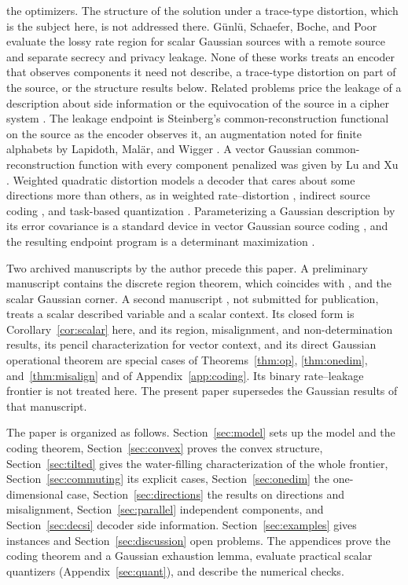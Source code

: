 \documentclass[11pt,onecolumn]{IEEEtran}
\begin{document}
the optimizers. The structure of the solution under a trace-type
distortion, which is the subject here, is not addressed there.
G\"unl\"u, Schaefer, Boche, and
Poor \cite{gunlu2022} evaluate the lossy rate region for scalar Gaussian
sources with a remote source and separate secrecy and privacy leakage.
None of these works treats an encoder that observes components it need
not describe, a trace-type distortion on part of the source, or the
structure results below. Related problems price the leakage of a
description about side information
\cite{yamamoto1983,tandon2013,makhdoumi2014} or the equivocation of the
source in a cipher system \cite{yamamoto1997,schieler2014}. The leakage
endpoint is Steinberg's common-reconstruction functional
\cite{steinberg2009} on the source as the encoder observes it, an
augmentation noted for finite alphabets by Lapidoth, Mal\"ar, and Wigger
\cite{lapidoth2014}. A vector Gaussian common-reconstruction function
with every component penalized was given by Lu and Xu \cite{luxu2021}.
Weighted quadratic distortion models a decoder that cares about some
directions more than others, as in weighted rate--distortion
\cite{sakrison1968}, indirect source coding \cite{wolfziv1970}, and
task-based quantization \cite{shlezinger2019}. Parameterizing a
Gaussian description by its error covariance is a standard device in
vector Gaussian source coding \cite{rahman2012}, and the resulting
endpoint program is a determinant maximization \cite{vandenberghe1998}.

Two archived manuscripts by the author precede this paper. A preliminary
manuscript \cite{bond2026prelim} contains the discrete region theorem,
which coincides with \cite[Theorem~3]{villard2013}, and the scalar
Gaussian corner. A second manuscript \cite{bond2026cr}, not submitted for
publication, treats a scalar described variable and a scalar context.
Its closed form is Corollary~\ref{cor:scalar} here, and its region,
misalignment, and non-determination results, its pencil characterization
for vector context, and its direct Gaussian operational theorem are
special cases of Theorems~\ref{thm:op}, \ref{thm:onedim},
and~\ref{thm:misalign} and of Appendix~\ref{app:coding}. Its binary
rate--leakage frontier is not treated here. The present paper supersedes
the Gaussian results of that manuscript.

The paper is organized as follows. Section~\ref{sec:model} sets up the
model and the coding theorem, Section~\ref{sec:convex} proves the convex
structure, Section~\ref{sec:tilted} gives the water-filling
characterization of the whole frontier, Section~\ref{sec:commuting} its
explicit cases, Section~\ref{sec:onedim} the one-dimensional case,
Section~\ref{sec:directions} the results on directions and misalignment,
Section~\ref{sec:parallel} independent components, and
Section~\ref{sec:decsi} decoder side information.
Section~\ref{sec:examples} gives instances and
Section~\ref{sec:discussion} open problems. The appendices prove the
coding theorem and a Gaussian exhaustion lemma, evaluate practical
scalar quantizers (Appendix~\ref{sec:quant}), and describe the numerical
checks.
\end{document}
